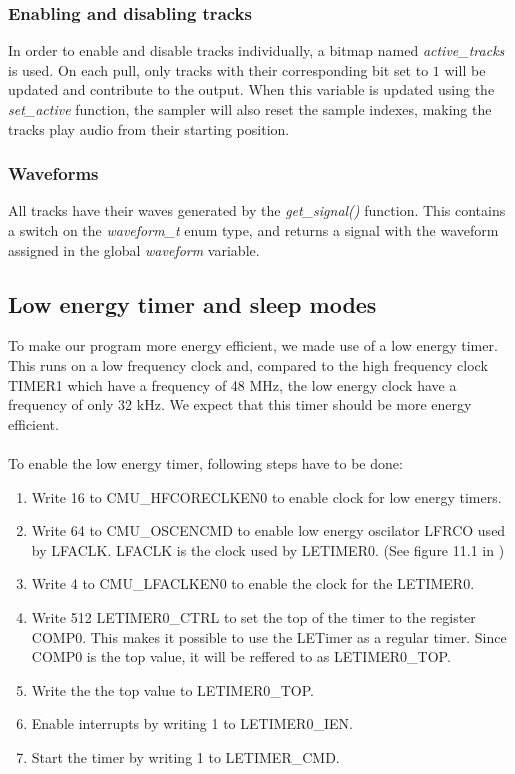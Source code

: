 \subsubsection{Enabling and disabling tracks}
In order to enable and disable tracks individually, a bitmap named \emph{active\_tracks} is used. On each pull, only tracks with their corresponding bit set to $1$ will be updated and contribute to the output. When this variable is updated using the \emph{set\_active} function, the sampler will also reset the sample indexes, making the tracks play audio from their starting position.

\subsubsection{Waveforms}
All tracks have their waves generated by the \emph{get\_signal()} function. This contains a switch on the \emph{waveform\_t} enum type, and returns a signal with the waveform assigned in the global \emph{waveform} variable.


\subsection{Low energy timer and sleep modes}

To make our program more energy efficient, we made use of a low energy timer. This runs on a low frequency clock and, compared to the high frequency clock TIMER1 which have a frequency of 48 MHz, the low energy clock have a frequency of only 32 kHz. We expect that this timer should be more energy efficient.\\
\\
To enable the low energy timer, following steps have to be done:

\begin{enumerate}
	\item {Write 16 to CMU\_HFCORECLKEN0 to enable clock for low energy timers.}
	\item {Write 64 to CMU\_OSCENCMD to enable low energy oscilator LFRCO used by LFACLK. LFACLK is the clock used by LETIMER0. (See figure 11.1 in \cite{reference_manual})}
	\item {Write 4 to CMU\_LFACLKEN0 to enable the clock for the LETIMER0.}
	\item {Write 512 LETIMER0\_CTRL to set the top of the timer to the register COMP0. This makes it possible to use the LETimer as a regular timer. Since COMP0 is the top value, it will be reffered to as LETIMER0\_TOP.}
	\item {Write the the top value to LETIMER0\_TOP.}
	\item {Enable interrupts by writing 1 to LETIMER0\_IEN.}
	\item {Start the timer by writing 1 to LETIMER\_CMD.} 
\end{enumerate}

